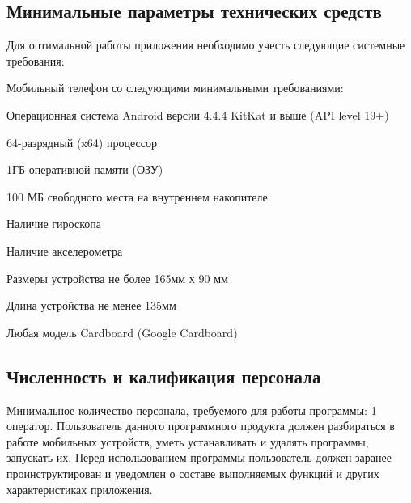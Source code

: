 \subsection{Минимальные параметры технических средств}
Для оптимальной работы приложения необходимо учесть следующие системные требования:
\begin{my_enumerate}
    \item Мобильный телефон со следующими минимальными требованиями:
    \begin{my_enumerate}
        \item Операционная система Android версии 4.4.4 KitKat и выше (API level 19+)
        \item 64-разрядный (x64) процессор
        \item 1ГБ оперативной памяти (ОЗУ)
        \item 100 МБ свободного места на внутреннем накопителе
        \item Наличие гироскопа
        \item Наличие акселерометра
        \item Размеры устройства не более 165мм х 90 мм
        \item Длина устройства не менее 135мм
    \end{my_enumerate}
    \item Любая модель Cardboard (Google Cardboard)
\end{my_enumerate}


\subsection{Численность и калификация персонала}
Минимальное количество персонала, требуемого для работы программы: 1 оператор. Пользователь данного программного продукта должен разбираться в работе мобильных устройств, уметь устанавливать и удалять программы, запускать их. Перед использованием программы пользователь должен заранее проинструктирован и уведомлен о составе выполняемых функций и других характеристиках приложения.

